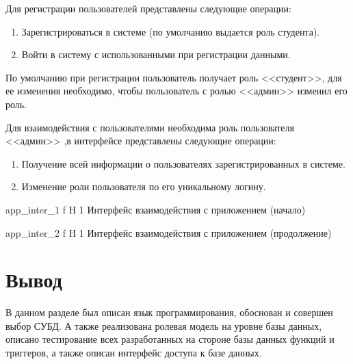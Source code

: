 Для регистрации пользователей представлены следующие операции:
\begin{enumerate}
	\item Зарегистрироваться в системе (по умолчанию выдается роль студента).
	\item Войти в систему с использованными при регистрации данными.
\end{enumerate}
По умолчанию при регистрации пользователь получает роль <<студент>>, для ее изменения необходимо, чтобы пользователь с ролью <<админ>> изменил его роль.

Для взаимодействия с пользователями необходима роль пользователя <<админ>> ,в интерфейсе представлены следующие операции:
\begin{enumerate}
	\item Получение всей информации о пользователях зарегистрированных в системе.
	\item Изменение роли пользователя по его уникальному логину.
\end{enumerate}



{app_inter_1} %
{f} %
{H} %
{1\textwidth} %
{Интерфейс взаимодействия с приложением (начало)} %


{app_inter_2} %
{f} %
{H} %
{1\textwidth} %
{Интерфейс взаимодействия с приложением (продолжение)} %

\section*{Вывод}
В данном разделе был описан язык программирования, обоснован и совершен  выбор СУБД. А также реализована ролевая модель на уровне базы данных, описано тестирование всех разработанных на стороне базы данных функций и триггеров, а также описан интерфейс доступа к базе данных. 











